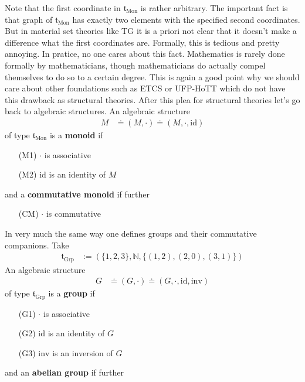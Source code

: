 \begin{exa}
Note that the first coordinate in $\mathfrak{t}_{\textrm{Mon}}$ is rather arbitrary. The important fact is that graph of $\mathfrak{t}_{\textrm{Mon}}$ has exactly two elements with the specified second coordinates. But in material set theories like TG it is a priori not clear that it doesn't make a difference  what the first coordinates are. Formally, this is tedious and pretty annoying. In pratice, no one cares about this fact. Mathematics is rarely done formally by mathematicians, though mathematicians do actually compel themselves to do so to a certain degree. This is again a good point why we should care about other foundations such as ETCS or UFP-HoTT which do not have this drawback as structural theories. After this plea for structural theories let's go back to algebraic structures. An algebraic structure
\begin{align*}
  M
  &\doteq
  (M,\cdot)
  \doteq
  (M,\cdot,\mathrm{id})
\end{align*}
of type $\mathfrak{t}_{\textrm{Mon}}$ is a \textbf{monoid} if
\begin{enumerate}
\item[(M1)]
$\cdot$ is associative
\item[(M2)]
$\mathrm{id}$ is an identity of $M$
\end{enumerate}
and a \textbf{commutative monoid} if further
\begin{enumerate}
\item[(CM)]
$\cdot$ is commutative
\end{enumerate}
In very much the same way one defines groups and their commutative companions. Take
\begin{align*}
  \mathfrak{t}_{\textrm{Grp}}
  &:=
  \left(
    \lbrace
      1,
      2,
      3
    \rbrace,
    \mathbb{N},
    \lbrace
      (1,2),
      (2,0),
      (3,1)
    \rbrace
  \right)
\end{align*}
An algebraic structure
\begin{align*}
  G
  &\doteq
  (G,\cdot)
  \doteq
  (G,\cdot,\mathrm{id},\mathrm{inv})
\end{align*}
of type $\mathfrak{t}_{\textrm{Grp}}$ is a \textbf{group} if
\begin{enumerate}
\item[(G1)]
$\cdot$ is associative
\item[(G2)]
$\mathrm{id}$ is an identity of $G$
\item[(G3)]
$\mathrm{inv}$ is an inversion of $G$
\end{enumerate}
and an \textbf{abelian group} if further

\end{exa}
